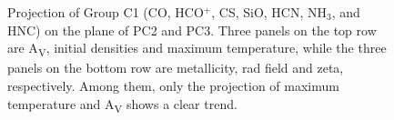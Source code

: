 \documentclass{aa}
\begin{document}
\begin{CJK*}{UTF8}{gbsn}
\begin{figure}[htbp]
{}
\caption{Projection of Group C1 (CO, HCO$^+$, CS, SiO, HCN, NH$_3$, and HNC) on the plane of PC2 and PC3. Three panels on the top row are A\textsubscript{V}, initial densities and maximum temperature, while the three panels on the bottom row are metallicity, rad field and zeta, respectively. Among them, only the projection of maximum temperature and A\textsubscript{V} shows a clear trend.}
\label{C1-23}
 \end{figure}
 

\end{CJK*}
\end{document}
